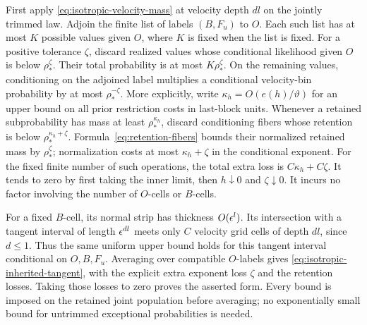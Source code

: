 First apply \eqref{eq:isotropic-velocity-mass} at velocity depth $dl$ on the
jointly trimmed law. Adjoin the finite list of labels $(B,F_u)$ to $O$.
Each such list has at most $K$ possible values given $O$, where $K$ is fixed
when the list is fixed. For a positive tolerance $\zeta$, discard realized
values whose conditional likelihood given $O$ is below $\rho_*^\zeta$.
Their total probability is at most $K\rho_*^\zeta$. On the remaining values,
conditioning on the adjoined label multiplies a conditional velocity-bin
probability by at most $\rho_*^{-\zeta}$. More explicitly, write
$\kappa_h=O(e(h)/\vartheta)$ for an upper bound on all prior restriction costs
in last-block units. Whenever a retained subprobability has mass at least
$\rho_*^{\kappa_h}$, discard conditioning fibers whose retention is below
$\rho_*^{\kappa_h+\zeta}$. Formula~\eqref{eq:retention-fibers} bounds their
normalized retained mass by $\rho_*^\zeta$; normalization costs at most
$\kappa_h+\zeta$ in the conditional exponent. For the fixed finite number
of such operations, the total extra loss is $C\kappa_h+C\zeta$.
It tends to zero by first taking the inner limit, then $h\downarrow0$ and
$\zeta\downarrow0$. It incurs no factor involving the number of $O$-cells
or $B$-cells.

For a fixed $B$-cell, its normal strip has thickness $O(\epsilon^l)$. Its
intersection with a tangent interval of length $\epsilon^{dl}$ meets only $C$
velocity grid cells of depth $dl$, since $d\leq1$. Thus the same uniform
upper bound holds for this tangent interval conditional on $O,B,F_u$.
Averaging over compatible $O$-labels gives
\eqref{eq:isotropic-inherited-tangent}, with the explicit extra exponent
loss $\zeta$ and the retention losses. Taking those losses to zero proves
the asserted form. Every bound is imposed on the retained joint population
before averaging; no exponentially small bound for untrimmed exceptional
probabilities is needed.

